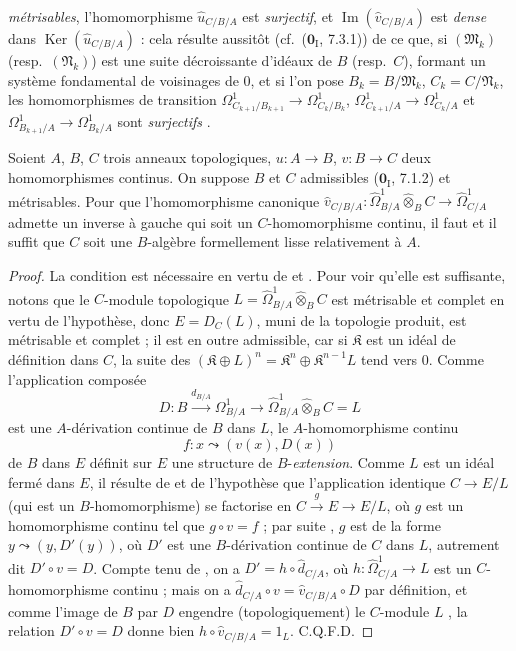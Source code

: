 \begin{env}[20.7.17]
\emph{métrisables}, l'homomorphisme $\widehat u_{C/B/A}$ est \emph{surjectif},
et $\operatorname{Im}(\widehat v_{C/B/A})$ est \emph{dense} dans
$\operatorname{Ker}(\widehat u_{C/B/A})$ : cela résulte aussitôt
(cf.\ ($\mathbf{0}_{\mathrm I}$, 7.3.1)) de ce que, si
$(\mathfrak{M}_k)$ (resp.\ $(\mathfrak{N}_k)$) est une suite décroissante
d'idéaux de $B$ (resp.\ $C$), formant un système fondamental de voisinages de
$0$, et si l'on pose $B_k=B/\mathfrak{M}_k$, $C_k=C/\mathfrak{N}_k$, les
homomorphismes de transition
$\Omega^1_{C_{k+1}/B_{k+1}}\to\Omega^1_{C_k/B_k}$,
$\Omega^1_{C_{k+1}/A}\to\Omega^1_{C_k/A}$ et
$\Omega^1_{B_{k+1}/A}\to\Omega^1_{B_k/A}$ sont \emph{surjectifs}
.
\end{env}

\begin{proposition}[20.7.18]
\label{0.20.7.18-fr}
Soient $A$, $B$, $C$ trois anneaux topologiques, $u:A\to B$, $v:B\to C$
deux homomorphismes continus. On suppose $B$ et $C$ admissibles
\textup{($\mathbf{0}_{\mathrm I}$, 7.1.2)} et métrisables. Pour que l'homomorphisme
canonique $\widehat v_{C/B/A}:\widehat{\Omega}^1_{B/A}\widehat\otimes_B C\to\widehat{\Omega}^1_{C/A}$
admette un inverse à gauche qui soit un $C$-homomorphisme continu, il faut et
il suffit que $C$ soit une $B$-algèbre formellement lisse relativement à $A$.
\end{proposition}

\begin{proof}
La condition est nécessaire en vertu de  et
. Pour voir qu'elle est suffisante, notons que le $C$-module
topologique
$L=\widehat{\Omega}^1_{B/A}\widehat\otimes_B C$ est
métrisable et
complet en vertu de l'hypothèse, donc $E=D_C(L)$, muni de la topologie produit,
est
métrisable et complet ; il est en outre admissible, car si $\mathfrak{K}$
est un idéal de définition dans $C$, la suite des
$(\mathfrak{K}\oplus L)^n=\mathfrak{K}^n\oplus\mathfrak{K}^{n-1}L$ tend vers
$0$. Comme l'application composée
\[
  D:B\xrightarrow{d_{B/A}}\Omega^1_{B/A}\to
  \widehat{\Omega}^1_{B/A}\widehat\otimes_B C=L
\]
est une $A$-dérivation continue de $B$ dans $L$, le $A$-homomorphisme continu
\[
  f:x\leadsto(v(x),D(x))
\]
de $B$ dans $E$ définit sur $E$ une structure de $B$-\emph{extension}. Comme $L$ est
un idéal fermé dans $E$, il résulte de  et de l'hypothèse
que l'application identique $C\to E/L$ (qui est un $B$-homomorphisme) se
factorise en $C\xrightarrow{g}E\to E/L$, où $g$ est un homomorphisme continu
tel que $g\circ v=f$ ; par suite , $g$ est de la forme
$y\leadsto(y,D'(y))$, où $D'$ est une $B$-dérivation continue de $C$ dans $L$,
autrement dit $D'\circ v=D$. Compte tenu de , on a
$D'=h\circ\widehat d_{C/A}$, où
$h:\widehat{\Omega}^1_{C/A}\to L$ est un $C$-homomorphisme continu ; mais on
a $\widehat d_{C/A}\circ v=\widehat v_{C/B/A}\circ D$ par définition, et
comme l'image de $B$ par $D$ engendre (topologiquement) le $C$-module $L$
, la relation $D'\circ v=D$ donne bien
$h\circ\widehat v_{C/B/A}=1_L$. C.Q.F.D.
\end{proof}

